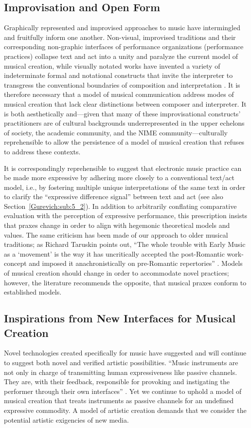 \subsection{Improvisation and Open Form}
\label{Gurevich:sub:3_2}
Graphically represented and improvised approaches to music have intermingled and fruitfully inform one another. Non-visual, improvised traditions and their corresponding non-graphic interfaces of performance organizations (performance practices) \cite{Hindley:2002} collapse text and act into a unity and paralyze the current model of musical creation, while visually notated works have invented a variety of indeterminate formal and notational constructs that invite the interpreter to transgress the conventional boundaries of composition and interpretation \cite{Eco:2004}. It is therefore necessary that a model of musical communication address modes of musical creation that lack clear distinctions between composer and interpreter. It is both aesthetically and---given that many of these improvisational constructs' practitioners are of cultural backgrounds underrepresented in the upper echelons of society, the academic community, and the NIME community---culturally reprehensible to allow the persistence of a model of musical creation that refuses to address these contexts.

It is correspondingly reprehensible to suggest that electronic music practice can be made more expressive by adhering more closely to a conventional text/act model, i.e., by fostering multiple unique interpretations of the same text in order to clarify the ``expressive difference signal'' between text and act \cite{Dobrian:2006} (see also Section~\ref{Gurevich:sub:5_2}). In addition to arbitrarily conflating comparative evaluation with the perception of expressive performance, this prescription insists that praxes change in order to align with hegemonic theoretical models and values. The same criticism has been made of our approach to older musical traditions; as Richard Taruskin points out, ``The whole trouble with Early Music as a `movement' is the way it has uncritically accepted the post-Romantic work-concept and imposed it anachronistically on pre-Romantic repertories'' \cite{Taruskin:1995}. Models of musical creation should change in order to accommodate novel practices; however, the literature recommends the opposite, that musical praxes conform to established models.

\subsection{Inspirations from New Interfaces for Musical Creation}
\label{Gurevich:sub:3_3}
Novel technologies created specifically for music have suggested and will continue to suggest both novel and verified artistic possibilities. ``Music instruments are not only in charge of transmitting human expressiveness like passive channels. They are, with their feedback, responsible for provoking and instigating the performer through their own interfaces'' \cite{Jorda:2005}. Yet we continue to uphold a model of musical creation that treats instruments as passive channels for an undefined expressive commodity. A model of artistic creation demands that we consider the potential artistic exigencies of new media.

